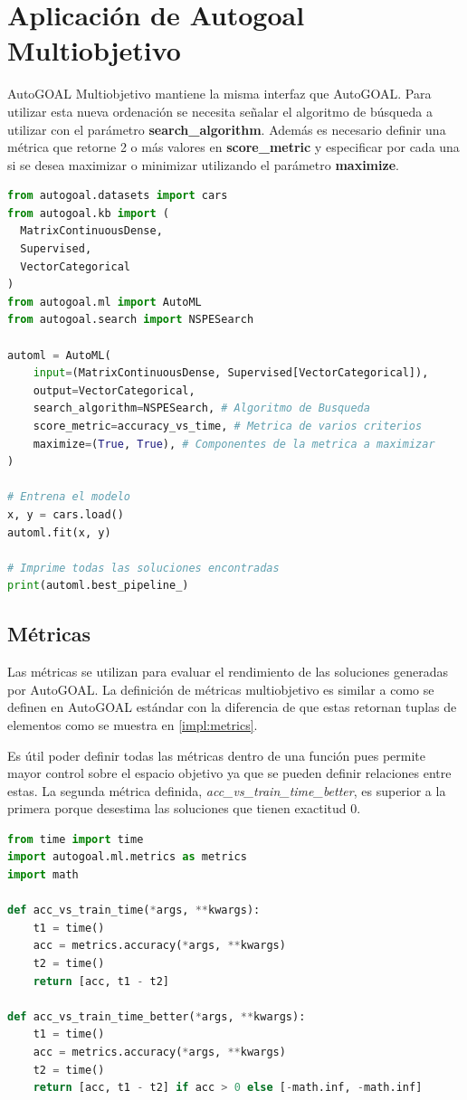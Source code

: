 \section{Aplicaci\'on de Autogoal Multiobjetivo}
AutoGOAL Multiobjetivo mantiene la misma interfaz que AutoGOAL. Para utilizar esta nueva ordenaci\'on se necesita  se\~nalar el algoritmo de b\'usqueda a utilizar con el par\'ametro \textbf{search\_algorithm}. Adem\'as es necesario definir una m\'etrica que retorne 2 o m\'as valores en \textbf{score\_metric} y especificar por cada una si se desea maximizar o minimizar utilizando el par\'ametro  \textbf{maximize}. 

\begin{lstlisting}[caption=Uso de AutoGOAL con multiobjetivo, language=Python]
from autogoal.datasets import cars
from autogoal.kb import (
  MatrixContinuousDense,
  Supervised,
  VectorCategorical
)
from autogoal.ml import AutoML
from autogoal.search import NSPESearch

automl = AutoML(
    input=(MatrixContinuousDense, Supervised[VectorCategorical]),
    output=VectorCategorical,
    search_algorithm=NSPESearch, # Algoritmo de Busqueda
    score_metric=accuracy_vs_time, # Metrica de varios criterios
    maximize=(True, True), # Componentes de la metrica a maximizar
)

# Entrena el modelo
x, y = cars.load()
automl.fit(x, y)

# Imprime todas las soluciones encontradas
print(automl.best_pipeline_) 
\end{lstlisting}

\subsection{M\'etricas}
Las m\'etricas se utilizan para evaluar el rendimiento de las soluciones generadas por AutoGOAL.
La definici\'on de m\'etricas multiobjetivo  es similar a como se definen en AutoGOAL est\'andar con la diferencia de que estas retornan tuplas de elementos como se muestra en \ref{impl:metrics}. 

Es \'util poder definir todas las m\'etricas dentro de una funci\'on pues permite mayor control sobre el espacio objetivo ya que se pueden definir relaciones entre estas. La segunda m\'etrica definida, \textit{acc\_vs\_train\_time\_better}, es superior a la primera porque desestima las soluciones que tienen exactitud 0.

\begin{lstlisting}[caption=Ejemplo de m\'etrica: \textit{accuracy} contra tiempo, language=Python, label=impl:metrics]
from time import time
import autogoal.ml.metrics as metrics
import math

def acc_vs_train_time(*args, **kwargs):
    t1 = time()
    acc = metrics.accuracy(*args, **kwargs)
    t2 = time()
    return [acc, t1 - t2]

def acc_vs_train_time_better(*args, **kwargs):
    t1 = time()
    acc = metrics.accuracy(*args, **kwargs)
    t2 = time()
    return [acc, t1 - t2] if acc > 0 else [-math.inf, -math.inf]
\end{lstlisting}
